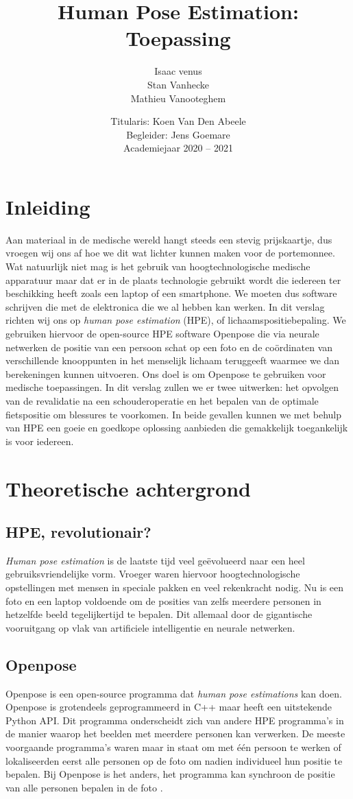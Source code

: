 \documentclass[a4paper,twoside,kulak]{kulakreport}
\title{Human Pose Estimation:\\Toepassing}
\subtitle{}
\author{Isaac venus\\Stan Vanhecke\\Mathieu Vanooteghem}
\institute{KU Leuven Kulak, Wetenschap \& Technologie}
\date{Titularis: Koen Van Den Abeele\\Begleider: Jens Goemare\\Academiejaar 2020 -- 2021}
\begin{document}

\titlepage

\tableofcontents

\chapter*{Inleiding}
Aan materiaal in de medische wereld hangt steeds een stevig prijskaartje, dus vroegen wij ons af hoe we dit wat lichter kunnen maken voor de portemonnee. Wat natuurlijk niet mag is het gebruik van hoogtechnologische medische apparatuur maar dat er in de plaats technologie gebruikt wordt die iedereen ter beschikking heeft zoals een laptop of een smartphone. We moeten dus software schrijven die met de elektronica die we al hebben kan werken. In dit verslag richten wij ons op \emph{human pose estimation} (HPE), of lichaamspositiebepaling. We gebruiken hiervoor de open-source HPE software Openpose die via neurale netwerken de positie van een persoon schat op een foto en de coördinaten van verschillende knooppunten in het menselijk lichaam teruggeeft waarmee we dan berekeningen kunnen uitvoeren. Ons doel is om Openpose te gebruiken voor medische toepassingen. In dit verslag zullen we er twee uitwerken: het opvolgen van de revalidatie na een schouderoperatie en het bepalen van de optimale fietspositie om blessures te voorkomen. In beide gevallen kunnen we met behulp van HPE een goeie en goedkope oplossing aanbieden die gemakkelijk toegankelijk is voor iedereen.

\chapter{Theoretische achtergrond}
\section{HPE, revolutionair?}
\emph{Human pose estimation} is de laatste tijd veel geëvolueerd naar een heel gebruiksvriendelijke vorm. Vroeger waren hiervoor hoogtechnologische opstellingen met mensen in speciale pakken en veel rekenkracht nodig. Nu is een foto en een laptop voldoende om de posities van zelfs meerdere personen in hetzelfde beeld tegelijkertijd te bepalen. Dit allemaal door de gigantische vooruitgang op vlak van artificiele intelligentie en neurale netwerken.
\section{Openpose}
Openpose is een open-source programma dat \emph{human pose estimations} kan doen. Openpose is grotendeels geprogrammeerd in C++ maar heeft een uitstekende Python API. Dit programma onderscheidt zich van andere HPE programma's in de manier waarop het beelden met meerdere personen kan verwerken. De meeste voorgaande programma's waren maar in staat om met één persoon te werken of lokaliseerden eerst alle personen op de foto om nadien individueel hun positie te bepalen. Bij Openpose is het anders, het programma kan synchroon de positie van alle personen bepalen in de foto \cite{openpose}.
\end{document}
